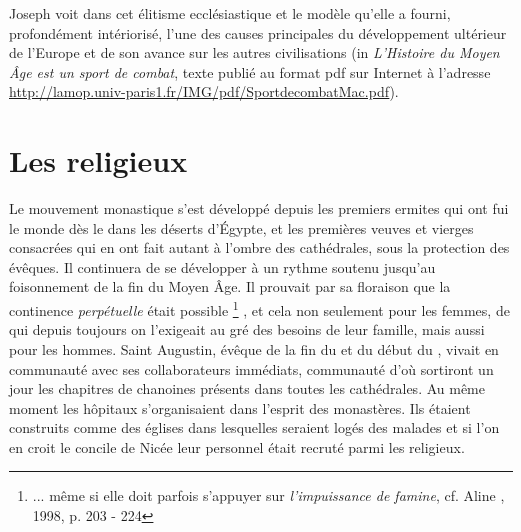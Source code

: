  Joseph  voit dans cet élitisme ecclésiastique et le modèle qu'elle a fourni, profondément intériorisé, l'une des causes principales du développement ultérieur de l'Europe et de son avance sur les autres civilisations (in \emph{L'Histoire du Moyen Âge est un sport de combat}, texte publié au format pdf sur Internet à l'adresse \url{http://lamop.univ-paris1.fr/IMG/pdf/SportdecombatMac.pdf}).
 
 \section{Les religieux}
 Le mouvement monastique s'est développé depuis les premiers ermites qui ont fui le monde dès le  dans les déserts d'Égypte, et les premières veuves et vierges consacrées qui en ont fait autant à l'ombre des cathédrales, sous la protection des évêques. Il continuera de se développer à un rythme soutenu jusqu'au foisonnement de la fin du Moyen Âge. Il prouvait par sa floraison que la continence \emph{perpétuelle} était possible%
\footnote{... même si elle doit parfois s'appuyer sur \emph{l'impuissance de famine}, cf. Aline , 1998, p. 203 - 224}%
, et cela non seulement pour les femmes, de qui depuis toujours on l'exigeait au gré des besoins de leur famille, mais aussi pour les hommes. Saint Augustin, évêque de la fin du  et du début du , vivait en communauté avec ses collaborateurs immédiats, communauté d'où sortiront un jour les chapitres de chanoines présents dans toutes les cathédrales. Au même moment les hôpitaux s'organisaient dans l'esprit des monastères. Ils étaient construits comme des églises dans lesquelles seraient logés des malades et si l'on en croit le concile de Nicée leur personnel était recruté parmi les religieux.


